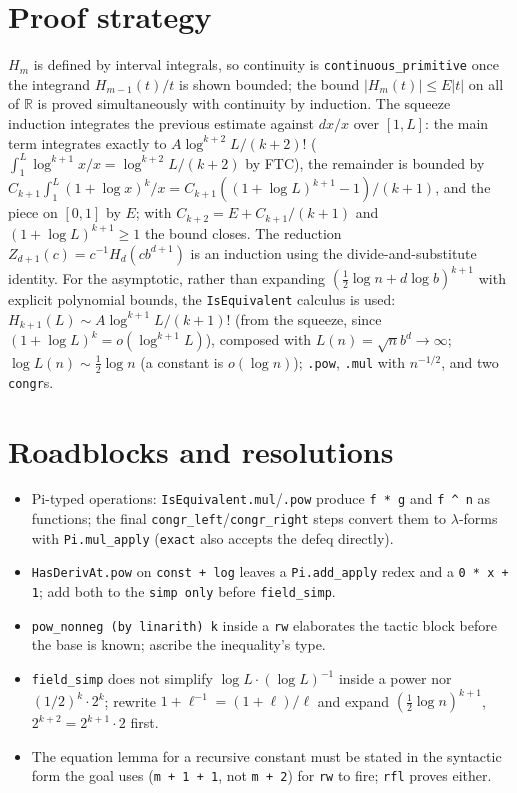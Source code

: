 \documentclass[11pt]{article}
\begin{document}
\section{Proof strategy}
$H_m$ is defined by interval integrals, so continuity is \texttt{continuous\_primitive} once the
integrand $H_{m-1}(t)/t$ is shown bounded; the bound $|H_m(t)|\le E|t|$ on all of $\mathbb R$ is proved
simultaneously with continuity by induction. The squeeze induction integrates the previous estimate
against $dx/x$ over $[1,L]$: the main term integrates exactly to $A\log^{k+2}L/(k+2)!$
($\int_1^L\log^{k+1}x/x=\log^{k+2}L/(k+2)$ by FTC), the remainder is bounded by
$C_{k+1}\int_1^L(1+\log x)^k/x=C_{k+1}((1+\log L)^{k+1}-1)/(k+1)$, and the piece on $[0,1]$ by $E$;
with $C_{k+2}=E+C_{k+1}/(k+1)$ and $(1+\log L)^{k+1}\ge1$ the bound closes. The reduction
$Z_{d+1}(c)=c^{-1}H_d(cb^{d+1})$ is an induction using the divide-and-substitute identity. For the
asymptotic, rather than expanding $(\tfrac12\log n+d\log b)^{k+1}$ with explicit polynomial bounds, the
\texttt{IsEquivalent} calculus is used: $H_{k+1}(L)\sim A\log^{k+1}L/(k+1)!$ (from the squeeze, since
$(1+\log L)^k=o(\log^{k+1}L)$), composed with $L(n)=\sqrt nb^{d}\to\infty$; $\log L(n)\sim\tfrac12\log n$
(a constant is $o(\log n)$); \texttt{.pow}, \texttt{.mul} with $n^{-1/2}$, and two \texttt{congr}s.

\section{Roadblocks and resolutions}
\begin{itemize}
\item Pi-typed operations: \texttt{IsEquivalent.mul}/\texttt{.pow} produce \texttt{f * g} and
\texttt{f \^{} n} as functions; the final \texttt{congr\_left}/\texttt{congr\_right} steps convert them to
$\lambda$-forms with \texttt{Pi.mul\_apply} (\texttt{exact} also accepts the defeq directly).
\item \texttt{HasDerivAt.pow} on \texttt{const + log} leaves a \texttt{Pi.add\_apply} redex and a
\texttt{0 * x + 1}; add both to the \texttt{simp only} before \texttt{field\_simp}.
\item \texttt{pow\_nonneg (by linarith) k} inside a \texttt{rw} elaborates the tactic block before the
base is known; ascribe the inequality's type.
\item \texttt{field\_simp} does not simplify $\log L\cdot(\log L)^{-1}$ inside a power nor
$(1/2)^k\cdot2^k$; rewrite $1+\ell^{-1}=(1+\ell)/\ell$ and expand $(\tfrac12\log n)^{k+1}$,
$2^{k+2}=2^{k+1}\cdot2$ first.
\item The equation lemma for a recursive constant must be stated in the syntactic form the goal
uses (\texttt{m + 1 + 1}, not \texttt{m + 2}) for \texttt{rw} to fire; \texttt{rfl} proves either.
\end{itemize}
\end{document}
